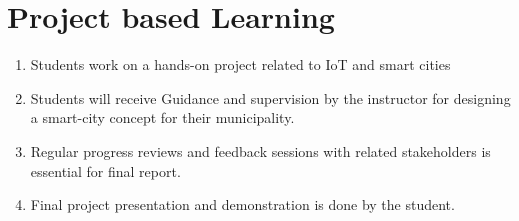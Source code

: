 


\section{Project based Learning}
\begin{enumerate}
    \item Students work on a hands-on project related to IoT and smart cities
    \item Students will receive Guidance and supervision by the instructor for designing a smart-city concept for their municipality.
    \item Regular progress reviews and feedback sessions with related stakeholders is essential for final report.
    \item Final project presentation and demonstration is done by the student.
    
    
\end{enumerate}
